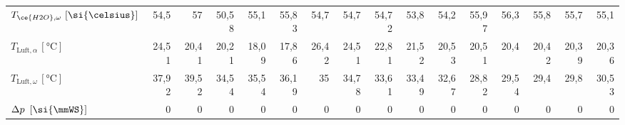 \begin{table}[h!]
{\begin{tabular}{l|rrrrr|rrrrr|rrrrr}
		$T_{\ce{H2O},\omega} \, \left[\si{\celsius}\right]$   & 54,5  & 57    & 50,58 & 55,1  & 55,83 & 54,7  & 54,7  & 54,72 & 53,8  & 54,2  & 55,97 & 56,3  & 55,8  & 55,7  & 55,1 \\
		 $T_{\text{Luft},\alpha}\, \left[\si{\celsius}\right]$  & 24,51 & 20,41 & 20,21 & 18,09 & 17,86 & 26,42 & 24,51 & 22,81 & 21,52 & 20,53 & 20,51 & 20,4  & 20,42 & 20,39 & 20,36 \\
		$T_{\text{Luft},\omega}\, \left[\si{\celsius}\right]$   & 37,92 & 39,52 & 34,54 & 35,54 & 36,19 & 35    & 34,78 & 33,61 & 33,49 & 32,67 & 28,82 & 29,54 & 29,4  & 29,8  & 30,53 \\
		$\Delta p \ \left[\si{\mmWS}\right]$    & 0     & 0     & 0     & 0     & 0     & 0     & 0     & 0     & 0     & 0     & 0     & 0     & 0     & 0     & 0 \\
		\bottomrule
	\end{tabular}}
	\label{tab:ergebnisse}%
\end{table}%
\FloatBarrier





